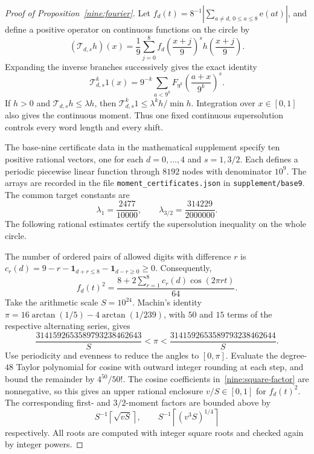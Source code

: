 \documentclass[11pt,a4paper]{article}
\theoremstyle{paperplain}
\numberwithin{equation}{section}
\begin{document}
\begin{proof}[Proof of Proposition~\ref{nine:fourier}]
Let
$f_d(t)=8^{-1}|\sum_{a\ne d,\,0\le a\le8}\mathrm e(at)|$,
and define a positive operator on continuous functions on the circle by
\[
 (\mathcal T_{d,s}h)(x)=\frac19\sum_{j=0}^8
 f_d\left(\frac{x+j}{9}\right)^s h\left(\frac{x+j}{9}\right).
\]
Expanding the inverse branches successively gives the exact identity
\begin{equation}\label{nine:transfer}
 \mathcal T_{d,s}^k1(x)=9^{-k}
 \sum_{a<9^k}F_{9^k}\left(\frac{a+x}{9^k}\right)^s.
\end{equation}
If $h>0$ and $\mathcal T_{d,s}h\le\lambda h$, then
$\mathcal T_{d,s}^k1\le\lambda^kh/\min h$.
Integration over $x\in[0,1]$ also gives the continuous moment.
Thus one fixed continuous supersolution controls every word length and every shift.

The base-nine certificate data in the mathematical supplement specify
ten positive rational vectors, one for each $d=0,\ldots,4$ and
$s=1,3/2$. Each defines a periodic piecewise linear function through
$8192$ nodes with denominator $10^9$.
The arrays are recorded in the file \texttt{moment\_certificates.json}
in \texttt{supplement/base9}.
The common target constants are
\begin{equation}\label{nine:lambdas}
 \lambda_1=\frac{2477}{10000},\qquad
 \lambda_{3/2}=\frac{314229}{2000000}.
\end{equation}
The following rational estimates certify the supersolution inequality
on the whole circle.

The number of ordered pairs of allowed digits with difference $r$ is
$c_r(d)=9-r-\mathbf1_{d+r\le8}-\mathbf1_{d-r\ge0}\ge0$.
Consequently,
\begin{equation}\label{nine:square-factor}
 f_d(t)^2=\frac{8+2\sum_{r=1}^8c_r(d)\cos(2\pi rt)}{64}.
\end{equation}
Take the arithmetic scale $S=10^{24}$.
Machin's identity
$\pi=16\arctan(1/5)-4\arctan(1/239)$,
with $50$ and $15$ terms of the respective alternating series, gives
\[
 \frac{3141592653589793238462643}{S}<\pi<
 \frac{3141592653589793238462644}{S}.
\]
Use periodicity and evenness to reduce the angles to $[0,\pi]$.
Evaluate the degree-$48$ Taylor polynomial for cosine with outward integer
rounding at each step, and bound the remainder by $4^{50}/50!$.
The cosine coefficients in~\eqref{nine:square-factor} are nonnegative,
so this gives an upper rational enclosure $v/S\in[0,1]$ for $f_d(t)^2$.
The corresponding first- and $3/2$-moment factors are bounded above by
\[
 S^{-1}\left\lceil\sqrt{vS}\right\rceil,\qquad
 S^{-1}\left\lceil(v^3S)^{1/4}\right\rceil
\]
respectively. All roots are computed with integer square roots and checked
again by integer powers.


\end{proof}
\end{document}

